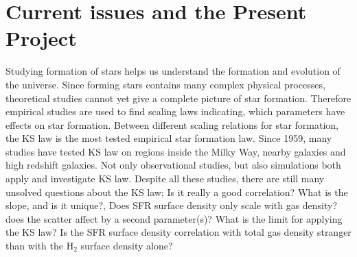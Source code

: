 



\section{Current issues and the Present Project}
 \label{chap:cipp}
 Studying formation of stars helps us understand the formation and evolution of the universe. Since forming stars contains many complex physical processes, theoretical studies cannot yet give a complete picture of star formation. Therefore empirical studies are used to find scaling laws indicating, which parameters have effects on star formation. Between different scaling relations for star formation, the KS law is the most tested empirical star formation law. Since 1959, many studies have tested KS law on regions inside the Milky Way, nearby galaxies and high redshift galaxies. Not only observational studies, but also  simulations both apply and investigate KS law. Despite all these studies, there are still many unsolved questions about the KS law; Is it really a good correlation? What is the slope, and is it unique?, Does SFR surface density only scale with gas density? does the scatter affect by a second parameter(s)? What is the limit for applying the KS law? Is the SFR surface density correlation with total gas density stranger than with the H$_2$ surface density alone?

